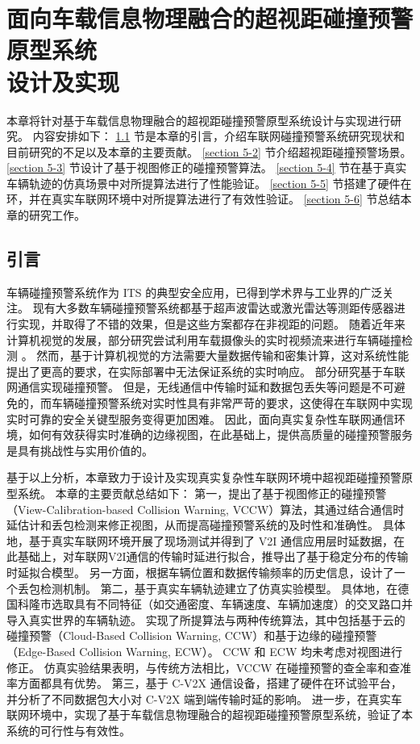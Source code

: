 \chapter[面向车载信息物理融合的超视距碰撞预警原型系统设计及实现]{面向车载信息物理融合的超视距碰撞预警原型系统\\设计及实现}
本章将针对基于车载信息物理融合的超视距碰撞预警原型系统设计与实现进行研究。
内容安排如下：
\ref{section 5-1} 节是本章的引言，介绍车联网碰撞预警系统研究现状和目前研究的不足以及本章的主要贡献。
\ref{section 5-2} 节介绍超视距碰撞预警场景。
\ref{section 5-3} 节设计了基于视图修正的碰撞预警算法。
\ref{section 5-4} 节在基于真实车辆轨迹的仿真场景中对所提算法进行了性能验证。
\ref{section 5-5} 节搭建了硬件在环，并在真实车联网环境中对所提算法进行了有效性验证。
\ref{section 5-6} 节总结本章的研究工作。

\section{引言}\label{section 5-1}

车辆碰撞预警系统作为 ITS 的典型安全应用，已得到学术界与工业界的广泛关注。
现有大多数车辆碰撞预警系统都基于超声波雷达或激光雷达等测距传感器进行实现\cite{song2018real, wu2019series}，并取得了不错的效果，但是这些方案都存在非视距的问题。
随着近年来计算机视觉的发展，部分研究尝试利用车载摄像头的实时视频流来进行车辆碰撞检测 \cite{wang2016vision, song2018lane}。
然而，基于计算机视觉的方法需要大量数据传输和密集计算，这对系统性能提出了更高的要求，在实际部署中无法保证系统的实时响应。 
部分研究基于车联网通信实现碰撞预警\cite{hafner2013cooperative, gelbal2017elastic}。
但是，无线通信中传输时延和数据包丢失等问题是不可避免的，而车辆碰撞预警系统对实时性具有非常严苛的要求，这使得在车联网中实现实时可靠的安全关键型服务变得更加困难。
因此，面向真实复杂性车联网通信环境，如何有效获得实时准确的边缘视图，在此基础上，提供高质量的碰撞预警服务是具有挑战性与实用价值的。

基于以上分析，本章致力于设计及实现真实复杂性车联网环境中超视距碰撞预警原型系统。
本章的主要贡献总结如下：
第一，提出了基于视图修正的碰撞预警（View-Calibration-based Collision Warning, VCCW）算法，其通过结合通信时延估计和丢包检测来修正视图，从而提高碰撞预警系统的及时性和准确性。
具体地，基于真实车联网环境开展了现场测试并得到了 V2I 通信应用层时延数据，在此基础上，对车联网V2I通信的传输时延进行拟合，推导出了基于稳定分布的传输时延拟合模型。
另一方面，根据车辆位置和数据传输频率的历史信息，设计了一个丢包检测机制。
第二，基于真实车辆轨迹建立了仿真实验模型。
具体地，在德国科隆市选取具有不同特征（如交通密度、车辆速度、车辆加速度）的交叉路口并导入真实世界的车辆轨迹。
实现了所提算法与两种传统算法，其中包括基于云的碰撞预警（Cloud-Based Collision Warning, CCW）和基于边缘的碰撞预警（Edge-Based Collision Warning, ECW）。
CCW 和 ECW 均未考虑对视图进行修正。
仿真实验结果表明，与传统方法相比，VCCW 在碰撞预警的查全率和查准率方面都具有优势。
第三，基于 C-V2X 通信设备，搭建了硬件在环试验平台，并分析了不同数据包大小对 C-V2X 端到端传输时延的影响。
进一步，在真实车联网环境中，实现了基于车载信息物理融合的超视距碰撞预警原型系统，验证了本系统的可行性与有效性。


